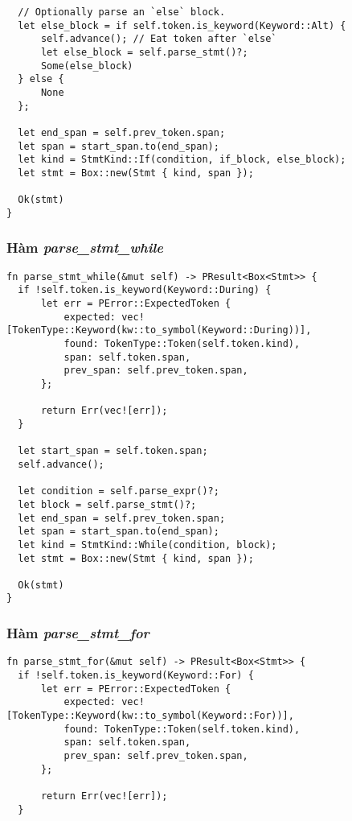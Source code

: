 {\begin{lstlisting}
  // Optionally parse an `else` block.
  let else_block = if self.token.is_keyword(Keyword::Alt) {
      self.advance(); // Eat token after `else`
      let else_block = self.parse_stmt()?;
      Some(else_block)
  } else {
      None
  };

  let end_span = self.prev_token.span;
  let span = start_span.to(end_span);
  let kind = StmtKind::If(condition, if_block, else_block);
  let stmt = Box::new(Stmt { kind, span });

  Ok(stmt)
}
\end{lstlisting}

\subsubsection{Hàm \textit{parse\_stmt\_while}}
\label{ap1:stmt_during}
\begin{lstlisting}
fn parse_stmt_while(&mut self) -> PResult<Box<Stmt>> {
  if !self.token.is_keyword(Keyword::During) {
      let err = PError::ExpectedToken {
          expected: vec![TokenType::Keyword(kw::to_symbol(Keyword::During))],
          found: TokenType::Token(self.token.kind),
          span: self.token.span,
          prev_span: self.prev_token.span,
      };

      return Err(vec![err]);
  }

  let start_span = self.token.span;
  self.advance();

  let condition = self.parse_expr()?;
  let block = self.parse_stmt()?;
  let end_span = self.prev_token.span;
  let span = start_span.to(end_span);
  let kind = StmtKind::While(condition, block);
  let stmt = Box::new(Stmt { kind, span });

  Ok(stmt)
}
\end{lstlisting}

\subsubsection{Hàm \textit{parse\_stmt\_for}}
\label{ap1:stmt_for}
\begin{lstlisting}
fn parse_stmt_for(&mut self) -> PResult<Box<Stmt>> {
  if !self.token.is_keyword(Keyword::For) {
      let err = PError::ExpectedToken {
          expected: vec![TokenType::Keyword(kw::to_symbol(Keyword::For))],
          found: TokenType::Token(self.token.kind),
          span: self.token.span,
          prev_span: self.prev_token.span,
      };

      return Err(vec![err]);
  }


\end{lstlisting}}
